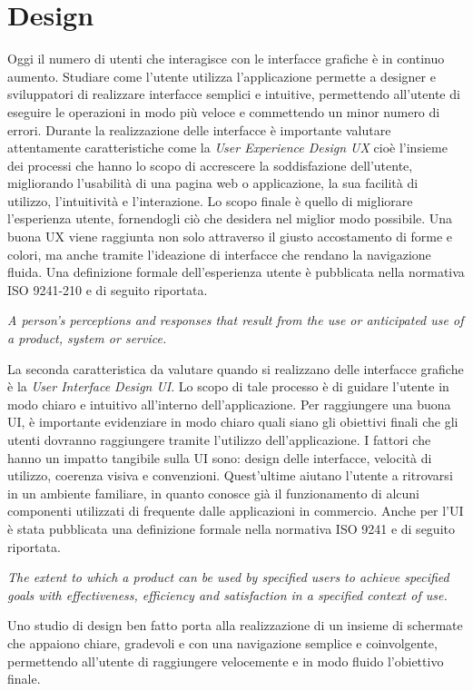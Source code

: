 \documentclass[12pt]{report}
\begin{document}
\chapter{Design}
Oggi il numero di utenti che interagisce con le interfacce grafiche è in continuo aumento. Studiare come l'utente utilizza l'applicazione permette a designer e sviluppatori di realizzare interfacce semplici e intuitive, permettendo all'utente di eseguire le operazioni in modo più veloce e commettendo un minor numero di errori. Durante la realizzazione delle interfacce è importante valutare attentamente caratteristiche come la \textit{User Experience Design UX} cioè l'insieme dei processi che hanno lo scopo di accrescere la soddisfazione dell’utente, migliorando l’usabilità di una pagina web o applicazione, la sua facilità di utilizzo, l’intuitività e l’interazione. Lo scopo finale è quello di migliorare l'esperienza utente, fornendogli ciò che desidera nel miglior modo possibile. Una buona UX viene raggiunta non solo attraverso il giusto accostamento di forme e colori, ma anche tramite l'ideazione di interfacce che rendano la navigazione fluida. Una definizione formale dell’esperienza utente è pubblicata nella normativa ISO 9241-210\cite{ISO9241210} e di seguito riportata.
\begin{center}
	\textit{A person's perceptions and responses that result from the use or anticipated use of a product, system or service.}
\end{center}
La seconda caratteristica da valutare quando si realizzano delle interfacce grafiche è la \textit{User Interface Design UI}. Lo scopo di tale processo è di guidare l'utente in modo chiaro e intuitivo all'interno dell'applicazione. Per raggiungere una buona UI,
è importante evidenziare in modo chiaro quali siano gli obiettivi finali che gli utenti dovranno raggiungere tramite l'utilizzo dell'applicazione. I fattori che hanno un impatto tangibile sulla UI sono: design delle interfacce, velocità di utilizzo, coerenza visiva e convenzioni. Quest'ultime aiutano l'utente a ritrovarsi in un ambiente familiare, in quanto conosce già il funzionamento di alcuni componenti utilizzati di frequente dalle applicazioni in commercio. Anche per l'UI è stata pubblicata una definizione formale nella normativa ISO 9241\cite{ISO9241} e di seguito riportata.
	\begin{center}
	\textit{The extent to which a product can be used by specified users to achieve specified goals with effectiveness, efficiency and satisfaction in a specified context of use.}
\end{center}
Uno studio di design ben fatto porta alla realizzazione di un insieme di schermate che appaiono chiare, gradevoli e con una navigazione semplice e coinvolgente, permettendo all'utente di raggiungere velocemente e in modo fluido l'obiettivo finale. %
\end{document}

